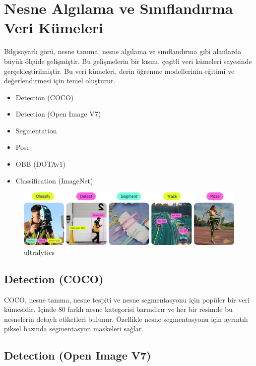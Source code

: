 \documentclass[11pt,a4paper]{report}
\begin{document}
    
    \section{Nesne Algılama ve Sınıflandırma Veri Kümeleri}
    
    Bilgisayarlı görü, nesne tanıma, nesne algılama ve sınıflandırma gibi alanlarda büyük ölçüde gelişmiştir. Bu gelişmelerin bir kısmı, çeşitli veri kümeleri sayesinde gerçekleştirilmiştir. Bu veri kümeleri, derin öğrenme modellerinin eğitimi ve değerlendirmesi için temel oluşturur.
    \begin{itemize}
    	\item Detection (COCO)
    	
    	\item Detection (Open Image V7)
    	
    	\item Segmentation 
    	
    	\item Pose 
    	
    	\item OBB (DOTAv1)
    	\item Classification (ImageNet) 
    \end{itemize}
    \newpage
    
    \begin{figure}[!h]
    	\centering
    	\includegraphics[width=\textwidth]{banner-tasks}
    	\caption{ultralytics}
    	\label{fig:ornek5}
    \end{figure}
    \subsection{Detection (COCO)}
    
    COCO, nesne tanıma, nesne tespiti ve nesne segmentasyonu için popüler bir veri kümesidir. İçinde 80 farklı nesne kategorisi barındırır ve her bir resimde bu nesnelerin detaylı etiketleri bulunur. Özellikle nesne segmentasyonu için ayrıntılı piksel bazında segmentasyon maskeleri sağlar.
    
    \subsection{Detection (Open Image V7)}
    
\end{document}
